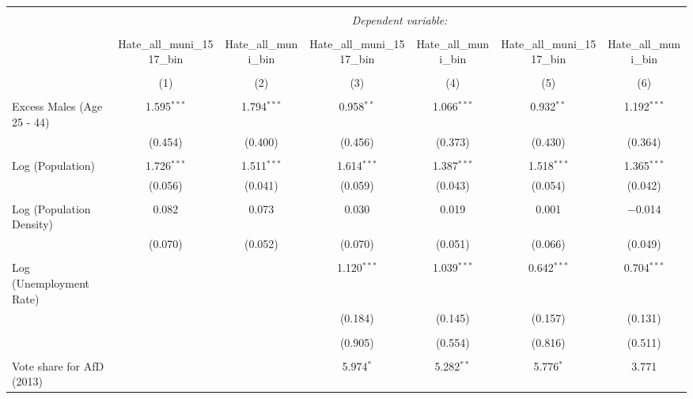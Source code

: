 
\begin{table}[!htbp] \centering 
  \caption{} 
  \label{} 
\begin{tabular}{@{\extracolsep{5pt}}lcccccc} 
\\[-1.8ex]\hline 
\hline \\[-1.8ex] 
 & \multicolumn{6}{c}{\textit{Dependent variable:}} \\ 
\cline{2-7} 
\\[-1.8ex] & Hate\_all\_muni\_1517\_bin & Hate\_all\_muni\_bin & Hate\_all\_muni\_1517\_bin & Hate\_all\_muni\_bin & Hate\_all\_muni\_1517\_bin & Hate\_all\_muni\_bin \\ 
\\[-1.8ex] & (1) & (2) & (3) & (4) & (5) & (6)\\ 
\hline \\[-1.8ex] 
 Excess Males (Age 25 - 44) & 1.595$^{***}$ & 1.794$^{***}$ & 0.958$^{**}$ & 1.066$^{***}$ & 0.932$^{**}$ & 1.192$^{***}$ \\ 
  & (0.454) & (0.400) & (0.456) & (0.373) & (0.430) & (0.364) \\ 
  & & & & & & \\ 
 Log (Population) & 1.726$^{***}$ & 1.511$^{***}$ & 1.614$^{***}$ & 1.387$^{***}$ & 1.518$^{***}$ & 1.365$^{***}$ \\ 
  & (0.056) & (0.041) & (0.059) & (0.043) & (0.054) & (0.042) \\ 
  & & & & & & \\ 
 Log (Population Density) & 0.082 & 0.073 & 0.030 & 0.019 & 0.001 & $-$0.014 \\ 
  & (0.070) & (0.052) & (0.070) & (0.051) & (0.066) & (0.049) \\ 
  & & & & & & \\ 
 Log (Unemployment Rate) &  &  & 1.120$^{***}$ & 1.039$^{***}$ & 0.642$^{***}$ & 0.704$^{***}$ \\ 
  &  &  & (0.184) & (0.145) & (0.157) & (0.131) \\ 
  & & & & & & \\ 
  &  &  & (0.905) & (0.554) & (0.816) & (0.511) \\ 
  & & & & & & \\ 
 Vote share for AfD (2013) &  &  & 5.974$^{*}$ & 5.282$^{**}$ & 5.776$^{*}$ & 3.771 \\ 

\end{tabular}
\end{table}

